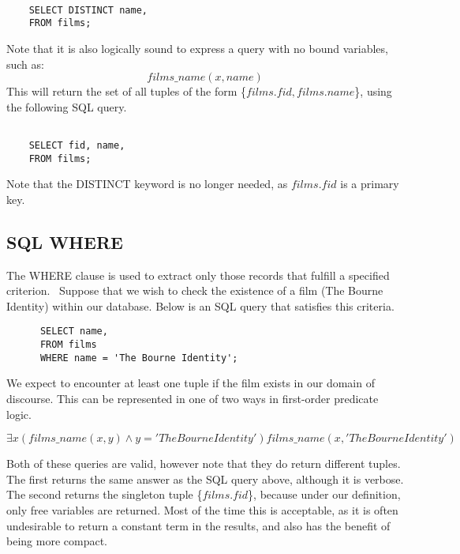 \documentclass[a4paper, 11pt]{article}
\begin{document}

    \begin{lstlisting}

    SELECT DISTINCT name,
    FROM films;

    \end{lstlisting}


    Note that it is also logically sound to express a query with no bound
    variables, such as:
    \[
      films\_name(x, name)
    \]
    This will return the set of all tuples of the form \{$films.fid,
    films.name$\}, using the following SQL query.

    \begin{lstlisting}

    SELECT fid, name,
    FROM films;

    \end{lstlisting}

    Note that the DISTINCT keyword is no longer needed, as $films.fid$ is a
    primary key.

  \subsection{SQL WHERE}

    The WHERE clause is used to extract only those records that fulfill a
    specified criterion.~\cite{w3WHERE} Suppose that we wish to check the
    existence of a film (The Bourne Identity) within our database. Below is an SQL query that
    satisfies this criteria.

    \begin{lstlisting}
      SELECT name,
      FROM films
      WHERE name = 'The Bourne Identity';
    \end{lstlisting}

    We expect to encounter at least one tuple if the film exists in our domain
    of discourse.  This can be represented
    in one of two ways in first-order predicate logic.

    \[
      \exists x(films\_name(x, y) \land y = 'The Bourne Identity')
      films\_name(x, 'The Bourne Identity')
    \]

    Both of these queries are valid, however note that they do return different
    tuples. The first returns the same answer as the SQL query above, although
    it is verbose. The second returns the singleton tuple \{$films.fid$\},
    because under our definition, only free variables are returned. Most of
    the time this is acceptable, as it is often undesirable to return a
    constant term in the results, and also has the benefit of being more
    compact.
\end{document}
